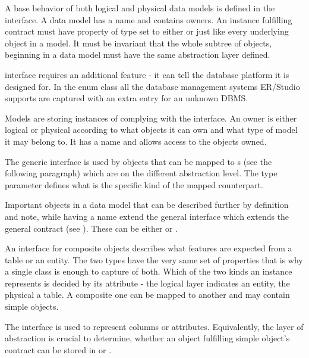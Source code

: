 A base behavior of both logical and physical data models is defined in the  interface.
A data model has a name and contains owners. An instance fulfilling  contract must have property of type  set to either  or  just like every underlying object in a model.
It must be invariant that the whole subtree of objects, beginning in a data model must have the same abstraction layer defined.

 interface requires an additional feature - it can tell the database platform it is designed for. 
In the enum class  all the database management systems ER/Studio supports are captured with an extra entry for an unknown DBMS.

Models are storing instances of complying with the  interface. An owner is either logical or physical according to what objects it can own and what type of model it may belong to. 
It has a name and allows access to the objects owned.

The generic interface  is used by objects that can be mapped to s (see the following paragraph) which are on the different abstraction level. The type parameter defines what is the specific kind of the mapped counterpart.

Important objects in a data model that can be described further by definition and note, while having a name extend the general  interface which extends the general  contract (see ). 
These can be either  or .

An interface for composite objects describes what features are expected from a table or an entity.
The two types have the very same set of properties that is why a single class is enough to capture of both. 
Which of the two kinds an instance represents is decided by its  attribute - the logical layer indicates an entity, the physical a table.
A composite one can be mapped to another  and may contain simple objects.

The  interface is used to represent columns or attributes. Equivalently, the layer of abstraction is crucial to determine, whether an object fulfilling simple object's contract can be stored in  or .

